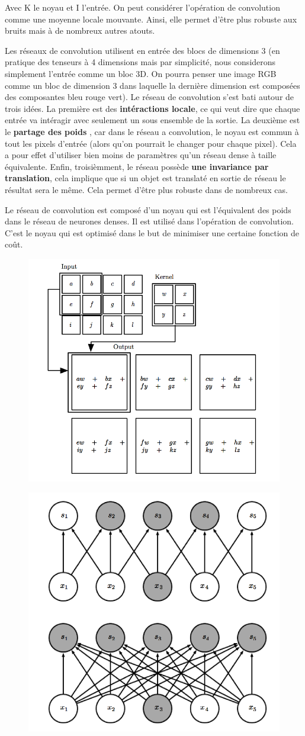 Avec K le noyau et I l'entrée. On peut considérer l'opération de convolution comme une moyenne locale mouvante. Ainsi, elle permet d'être plus robuste aux bruits mais à de nombreux autres atouts.


Les réseaux de convolution utilisent en entrée des blocs de dimensions 3 (en pratique des tenseurs à 4 dimensions mais par simplicité, nous considerons simplement l'entrée comme un bloc 3D. On pourra penser une image RGB comme un bloc de dimension 3 dans laquelle la dernière dimension est composées des composantes bleu rouge vert). Le réseau de convolution s'est bati autour de trois idées. La première est des \textbf{intéractions locale}, ce qui veut dire que chaque entrée va intéragir avec seulement un sous ensemble de la sortie. La deuxième est le \textbf{partage des poids }, car dans le réseau a convolution, le noyau est commun à tout les pixels d'entrée (alors qu'on pourrait le changer pour chaque pixel). Cela a pour effet d'utiliser bien moins de paramètres qu'un réseau dense à taille équivalente. Enfin, troisièmment, le réseau possède \textbf{une invariance par translation}, cela implique que si un objet est translaté en sortie de réseau le résultat sera le même. Cela permet d'être plus robuste dans de nombreux cas.

Le réseau de convolution est composé d'un noyau qui est l'équivalent des poids dans le réseau de neurones denses. Il est utilisé dans l'opération de convolution. C'est le noyau qui est optimisé dans le but de minimiser une certaine fonction de coût.

\begin{figure}[h!]
\centering
\begin{minipage}{.5\textwidth}
  \centering
  \includegraphics[width=.4\linewidth]{./assets/DeepLearning/conv.png}
  \label{fig:test1}
\end{minipage}%
\begin{minipage}{.5\textwidth}
  \centering
  \includegraphics[width=.4\linewidth]{./assets/DeepLearning/convVSdense.png}
  \label{fig:test2}
\end{minipage}
\end{figure}

